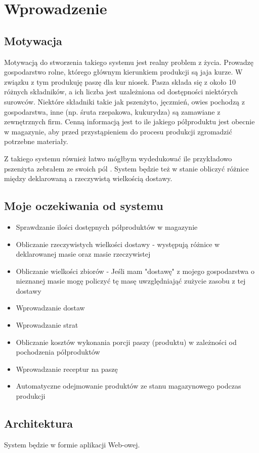 \documentclass[shortabstract]{iithesis}
\author         {Jakub Kopystiański}
\begin{document}

\chapter{Wprowadzenie}

\section{Motywacja}
	Motywacją do stworzenia takiego systemu jest realny problem z życia.  Prowadzę gospodarstwo rolne, którego głównym kierunkiem produkcji są jaja kurze. W związku z tym produkuję paszę dla kur niosek. Pasza składa się z około 10 różnych składników, a ich liczba jest uzależniona od dostępności niektórych surowców. Niektóre składniki takie jak pszenżyto, jęczmień, owies pochodzą z gospodarstwa, inne (np. śruta rzepakowa, kukurydza) są zamawiane z zewnętrznych firm. Cenną informacją jest to ile jakiego półproduktu jest obecnie w magazynie, aby przed przystąpieniem do procesu produkcji zgromadzić potrzebne materiały.

	Z takiego systemu również łatwo mógłbym wydedukować ile przykładowo pszenżyta zebrałem ze swoich pól . System będzie też w stanie obliczyć różnice między deklarowaną a rzeczywistą wielkością dostawy. 

\section {Moje oczekiwania od systemu}

\begin{itemize}
  \item Sprawdzanie ilości dostępnych półproduktów w magazynie
  \item Obliczanie rzeczywistych wielkości dostawy - występują różnice w deklarowanej masie oraz masie rzeczywistej
  \item Obliczanie wielkości zbiorów - Jeśli mam "dostawę" z mojego gospodarstwa o nieznanej masie mogę policzyć tę masę uwzględniająć zużycie zasobu z tej dostawy 
  \item  Wprowadzanie dostaw
  \item  Wprowadzanie strat
  \item  Obliczanie kosztów wykonania porcji paszy (produktu) w zależności od pochodzenia półproduktów
  \item  Wprowadzanie receptur na paszę
  \item  Automatyczne odejmowanie produktów ze stanu magazynowego podczas produkcji
\end{itemize} 

\section {Architektura}
	System będzie w formie aplikacji Web-owej.




\end{document}
